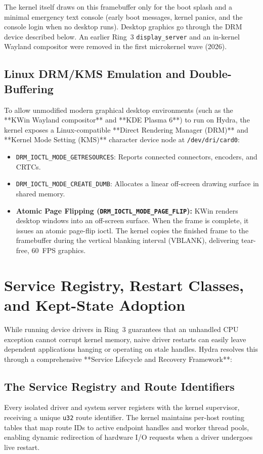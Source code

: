 The kernel itself draws on this framebuffer only for the boot splash and a minimal emergency text console (early boot messages, kernel panics, and the console login when no desktop runs). Desktop graphics go through the DRM device described below. An earlier Ring~3 \texttt{display\_server} and an in-kernel Wayland compositor were removed in the first microkernel wave (2026).

\subsection{Linux DRM/KMS Emulation and Double-Buffering}
To allow unmodified modern graphical desktop environments (such as the **KWin Wayland compositor** and **KDE Plasma 6**) to run on Hydra, the kernel exposes a Linux-compatible **Direct Rendering Manager (DRM)** and **Kernel Mode Setting (KMS)** character device node at \texttt{/dev/dri/card0}:
\begin{itemize}
    \item \texttt{DRM\_IOCTL\_MODE\_GETRESOURCES}: Reports connected connectors, encoders, and CRTCs.
    \item \texttt{DRM\_IOCTL\_MODE\_CREATE\_DUMB}: Allocates a linear off-screen drawing surface in shared memory.
    \item \textbf{Atomic Page Flipping (\texttt{DRM\_IOCTL\_MODE\_PAGE\_FLIP}):} KWin renders desktop windows into an off-screen surface. When the frame is complete, it issues an atomic page-flip ioctl. The kernel copies the finished frame to the framebuffer during the vertical blanking interval (VBLANK), delivering tear-free, 60~FPS graphics.
\end{itemize}

\section{Service Registry, Restart Classes, and Kept-State Adoption}
\label{sec:service_restart_architecture}

While running device drivers in Ring~3 guarantees that an unhandled CPU exception cannot corrupt kernel memory, naive driver restarts can easily leave dependent applications hanging or operating on stale handles. Hydra resolves this through a comprehensive **Service Lifecycle and Recovery Framework**:

\subsection{The Service Registry and Route Identifiers}
Every isolated driver and system server registers with the kernel supervisor, receiving a unique \texttt{u32} route identifier. The kernel maintains per-host routing tables that map route IDs to active endpoint handles and worker thread pools, enabling dynamic redirection of hardware I/O requests when a driver undergoes live restart.

